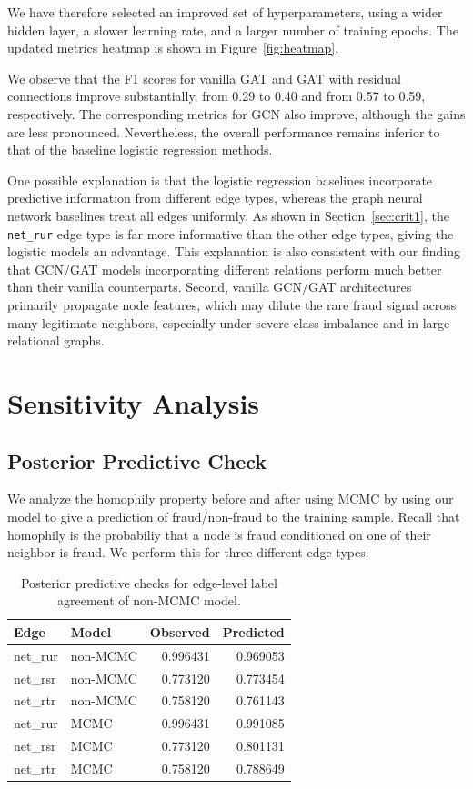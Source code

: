 \documentclass[10pt,reqno]{amsart}
\begin{document}
We have therefore selected an improved set of hyperparameters, using a wider hidden layer, a slower learning rate, and a larger number of training epochs. The updated metrics heatmap is shown in Figure~\ref{fig:heatmap}.

We observe that the F1 scores for vanilla GAT and GAT with residual connections improve substantially, from 0.29 to 0.40 and from 0.57 to 0.59, respectively. The corresponding metrics for GCN also improve, although the gains are less pronounced. Nevertheless, the overall performance remains inferior to that of the baseline logistic regression methods.

One possible explanation is that the logistic regression baselines incorporate predictive information from different edge types, whereas the graph neural network baselines treat all edges uniformly. As shown in Section~\ref{sec:crit1}, the \texttt{net\_rur} edge type is far more informative than the other edge types, giving the logistic models an advantage. This explanation is also consistent with our finding that GCN/GAT models incorporating different relations perform much better than their vanilla counterparts.
Second, vanilla GCN/GAT architectures primarily propagate node features, which may dilute the rare fraud signal across many legitimate neighbors, especially under severe class imbalance and in large relational graphs.

\section{Sensitivity Analysis}

\subsection{Posterior Predictive Check}

We analyze the homophily property before and after using MCMC by using our model to give a prediction of fraud/non-fraud to the training sample. Recall that homophily is the probabiliy that a node is fraud conditioned on one of their neighbor is fraud. We perform this for three different edge types. 

    \begin{table}[ht]
\centering
\begin{tabular}{llrr}
\toprule
\textbf{Edge} & \textbf{Model} & \textbf{Observed} & \textbf{Predicted} \\
\midrule
net\_rur & non-MCMC & 0.996431 & 0.969053 \\
net\_rsr & non-MCMC & 0.773120 & 0.773454 \\
net\_rtr & non-MCMC & 0.758120 & 0.761143 \\
net\_rur & MCMC & 0.996431 & 0.991085 \\
net\_rsr & MCMC & 0.773120 & 0.801131 \\
net\_rtr & MCMC & 0.758120 & 0.788649 \\
\bottomrule
\end{tabular}
\caption{Posterior predictive checks for edge-level label agreement of non-MCMC model.}
\label{tab:ppc_edge_checks}
\end{table}
\end{document}
